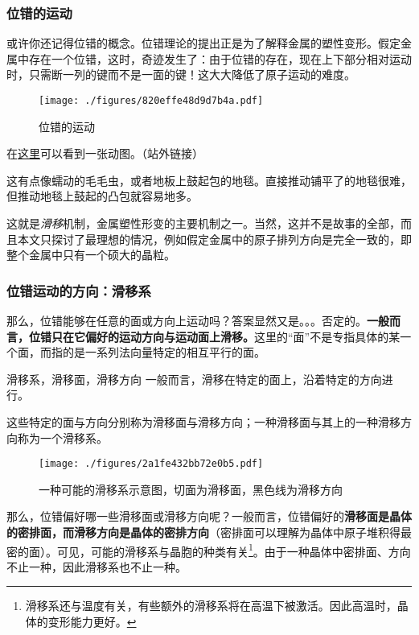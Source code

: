 \subsubsection{位错的运动}
或许你还记得位错的概念。位错理论的提出正是为了解释金属的塑性变形。假定金属中存在一个位错，这时，奇迹发生了：由于位错的存在，现在上下部分相对运动时，只需断一列的键而不是一面的键！这大大降低了原子运动的难度。
\begin{figure}[ht]
\centering
\texttt{[image: ./figures/820effe48d9d7b4a.pdf]}
\caption{位错的运动} \label{fig_MetDfm_3}
\end{figure}

在\href{https://m.sohu.com/a/350972084_120056486/}{这里}可以看到一张动图。（站外链接）

这有点像蠕动的毛毛虫，或者地板上鼓起包的地毯。直接推动铺平了的地毯很难，但推动地毯上鼓起的凸包就容易地多。

这就是\textsl{滑移}机制，金属塑性形变的主要机制之一。当然，这并不是故事的全部，而且本文只探讨了最理想的情况，例如假定金属中的原子排列方向是完全一致的，即整个金属中只有一个硕大的晶粒。

\subsubsection{位错运动的方向：滑移系}
那么，位错能够在任意的面或方向上运动吗？答案显然又是。。。否定的。\textbf{一般而言，位错只在它偏好的运动方向与运动面上滑移。}这里的“面”不是专指具体的某一个面，而指的是一系列法向量特定的相互平行的面。

\begin{theorem}{滑移系，滑移面，滑移方向}
一般而言，滑移在特定的面上，沿着特定的方向进行。

这些特定的面与方向分别称为滑移面与滑移方向；一种滑移面与其上的一种滑移方向称为一个滑移系。

\end{theorem}
\begin{figure}[ht]
\centering
\texttt{[image: ./figures/2a1fe432bb72e0b5.pdf]}
\caption{一种可能的滑移系示意图，切面为滑移面，黑色线为滑移方向} \label{fig_MetDfm_6}
\end{figure}

那么，位错偏好哪一些滑移面或滑移方向呢？一般而言，位错偏好的\textbf{滑移面是晶体的密排面，而滑移方向是晶体的密排方向}（密排面可以理解为晶体中原子堆积得最密的面）。可见，可能的滑移系与晶胞的种类有关\footnote{滑移系还与温度有关，有些额外的滑移系将在高温下被激活。因此高温时，晶体的变形能力更好。}。由于一种晶体中密排面、方向不止一种，因此滑移系也不止一种。


